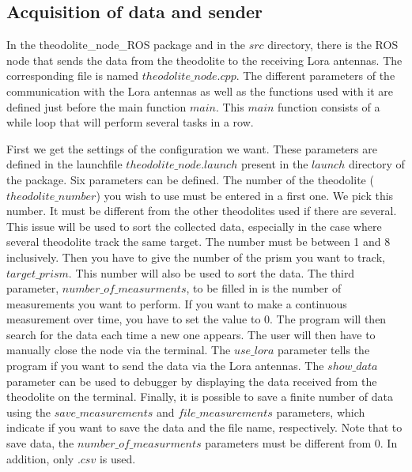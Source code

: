 \documentclass[10pt,letterpaper,oneside]{article}
\begin{document}

\subsection{Acquisition of data and sender}

In the theodolite\_node\_ROS package and in the $src$ directory, there is the ROS node that sends the data from the theodolite to the receiving Lora antennas.
The corresponding file is named $theodolite\_node.cpp$.
The different parameters of the communication with the Lora antennas as well as the functions used with it are defined just before the main function $main$.
This $main$ function consists of a while loop that will perform several tasks in a row.

First we get the settings of the configuration we want.
These parameters are defined in the launchfile $theodolite\_node.launch$ present in the $launch$ directory of the package.
Six parameters can be defined.
The number of the theodolite ($theodolite\_number$) you wish to use must be entered in a first one.
We pick this number.
It must be different from the other theodolites used if there are several.
This issue will be used to sort the collected data, especially in the case where several theodolite track the same target.
The number must be between 1 and 8 inclusively.
Then you have to give the number of the prism you want to track, $target\_prism$.
This number will also be used to sort the data.
The third parameter, $number\_of\_measurments$, to be filled in is the number of measurements you want to perform.
If you want to make a continuous measurement over time, you have to set the value to 0.
The program will then search for the data each time a new one appears.
The user will then have to manually close the node via the terminal.
The $use\_lora$ parameter tells the program if you want to send the data via the Lora antennas.
The $show\_data$ parameter can be used to debugger by displaying the data received from the theodolite on the terminal.
Finally, it is possible to save a finite number of data using the $save\_measurements$ and $file\_measurements$ parameters, which indicate if you want to save the data and the file name, respectively.
Note that to save data, the $number\_of\_measurments$ parameters must be different from 0.
In addition, only $.csv$ is used.
\end{document}
